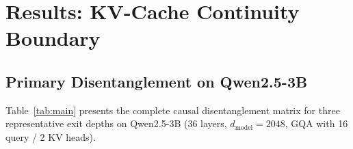 \documentclass{article}
\begin{document}
\section{Results: KV-Cache Continuity Boundary}
\label{sec:kv_results}

\subsection{Primary Disentanglement on Qwen2.5-3B}

Table~\ref{tab:main} presents the complete causal disentanglement matrix for three representative exit depths on Qwen2.5-3B (36 layers, $d_{\text{model}} = 2048$, GQA with 16 query / 2 KV heads).
\end{document}
